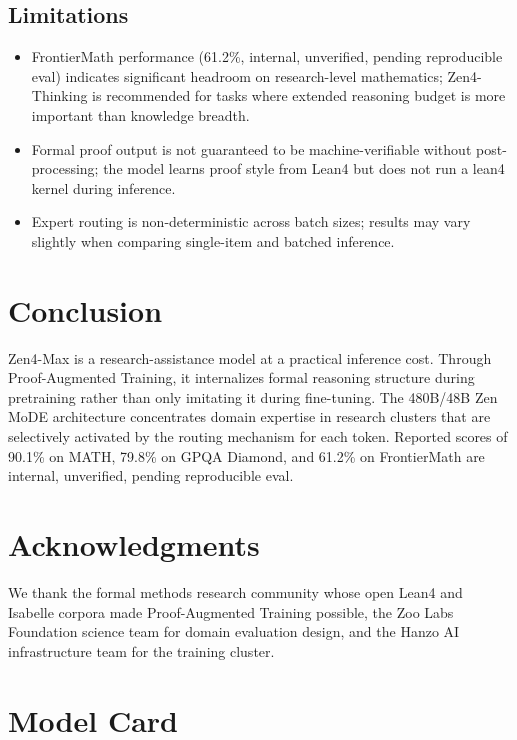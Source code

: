 \documentclass[11pt,a4paper]{article}
\begin{document}
\subsection{Limitations}

\begin{itemize}
    \item FrontierMath performance (61.2\%, internal, unverified, pending reproducible eval) indicates significant headroom on research-level
    mathematics; Zen4-Thinking is recommended for tasks where extended reasoning budget
    is more important than knowledge breadth.
    \item Formal proof output is not guaranteed to be machine-verifiable without post-processing;
    the model learns proof style from Lean4 but does not run a lean4 kernel during inference.
    \item Expert routing is non-deterministic across batch sizes; results may vary slightly
    when comparing single-item and batched inference.
\end{itemize}

\section{Conclusion}

Zen4-Max is a research-assistance model at a practical
inference cost. Through Proof-Augmented Training, it internalizes formal reasoning
structure during pretraining rather than only imitating it during fine-tuning. The 480B/48B
Zen MoDE architecture concentrates domain expertise in research clusters that are
selectively activated by the routing mechanism for each token. Reported scores of 90.1\% on MATH,
79.8\% on GPQA Diamond, and 61.2\% on FrontierMath are internal, unverified, pending reproducible eval.

\section*{Acknowledgments}

We thank the formal methods research community whose open Lean4 and Isabelle corpora
made Proof-Augmented Training possible, the Zoo Labs Foundation science team for
domain evaluation design, and the Hanzo AI infrastructure team for the training cluster.




\appendix

\section{Model Card}
\end{document}
